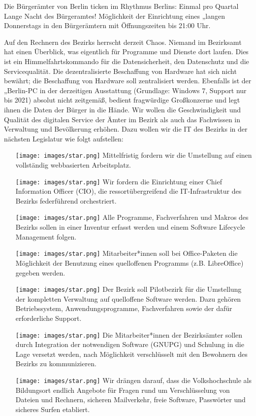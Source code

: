 \documentclass[a4paper,10pt]{article}
\begin{document}
Die Bürgerämter von Berlin ticken im Rhythmus Berlins: Einmal pro
Quartal Lange Nacht des Bürgeramtes! Möglichkeit der Einrichtung eines
„langen Donnerstags{\grqq} in den Bürgerämtern mit Öffnungszeiten bis 21:00
Uhr.

Auf den Rechnern des Bezirks herrscht derzeit Chaos. Niemand im
Bezirksamt hat einen Überblick, was eigentlich für Programme und Dienste
dort laufen. Dies ist ein Himmelfahrtskommando für die Datensicherheit,
den Datenschutz und die Servicequalität. Die dezentralisierte
Beschaffung von Hardware hat sich nicht bewährt; die Beschaffung von
Hardware soll zentralisiert werden. Ebenfalls ist der „Berlin-PC{\grqq} in
der derzeitigen Ausstattung (Grundlage: Windows 7, Support nur bis 2021)
absolut nicht zeitgemäß, bedient fragwürdige Großkonzerne und legt ihnen
die Daten der Bürger in die Hände. Wir wollen die Geschwindigkeit und
Qualität des digitalen Service der Ämter im Bezirk als auch das
Fachwissen in Verwaltung und Bevölkerung erhöhen. Dazu wollen wir die IT
des Bezirks in der nächsten Legislatur wie folgt aufstellen:

\begin{itemize}
\itemsep1pt\parskip0pt
\item[\texttt{[image: images/star.png]}]
  Mittelfristig fordern wir die Umstellung auf einen vollständig
  webbasierten Arbeitsplatz.
\item[\texttt{[image: images/star.png]}]
  Wir fordern die Einrichtung einer Chief Information Officer (CIO), die
  ressortübergreifend die IT-Infrastruktur des Bezirks federführend
  orchestriert.
\item[\texttt{[image: images/star.png]}]
  Alle Programme, Fachverfahren und Makros des Bezirks sollen in einer
  Inventur erfasst werden und einem Software Lifecycle Management
  folgen.
\item[\texttt{[image: images/star.png]}]
  Mitarbeiter*innen soll bei Office-Paketen die Möglichkeit der
  Benutzung eines quelloffenen Programms (z.B. LibreOffice) gegeben
  werden.
\item[\texttt{[image: images/star.png]}]
  Der Bezirk soll Pilotbezirk für die Umstellung der kompletten
  Verwaltung auf quelloffene Software werden. Dazu gehören
  Betriebssystem, Anwendungsprogramme, Fachverfahren sowie der dafür
  erforderliche Support.
\item[\texttt{[image: images/star.png]}]
  Die Mitarbeiter*innen der Bezirksämter sollen durch Integration der
  notwendigen Software (GNUPG) und Schulung in die Lage versetzt werden,
  nach Möglichkeit verschlüsselt mit den Bewohnern des Bezirks zu
  kommunizieren.
\item[\texttt{[image: images/star.png]}]
  Wir drängen darauf, dass die Volkshochschule als Bildungsort endlich
  Angebote für Fragen rund um Verschlüsselung von Dateien und Rechnern,
  sicheren Mailverkehr, freie Software, Passwörter und sicheres Surfen
  etabliert.
\end{itemize}
\end{document}
